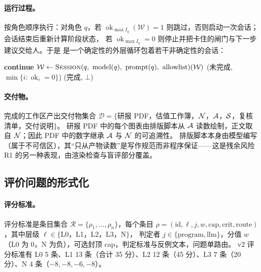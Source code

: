 \paragraph{运行过程。}
 按角色顺序执行：对角色 $q$，若 $\operatorname{ok}_{\max I_q}(\mathcal{W})=1$ 则跳过，否则启动一次会话；会话结束后重新计算阶段状态，
若 $\operatorname{ok}_{\max I_q}=0$ 则停止并把卡住的闸门与下一步建议交给人。于是  是一个确定性的外层循环包着若干非确定性的会话：
\begin{algorithm}[h]
\caption{研报生成的外层编排（ 的抽象）}
\label{alg:prob-run}
\begin{algorithmic}[1]
     \State \textbf{continue} 
    \EndIf
    \State $\mathcal{W}\gets \textsc{Session}(q,\ \text{model}(q),\ \text{prompt}(q),\ \text{allowlist})(\mathcal{W})$ 
     \State \Return (未完成, $\min\{i:\operatorname{ok}_i=0\}$)
    \EndIf
  \EndFor
  \State \Return (完成, $\bot$)
\EndFunction
\end{algorithmic}
\end{algorithm}

\paragraph{交付物。}
完成的工作区产出交付物集合
$\mathcal{D}=\{$研报 PDF，估值工作簿，$\mathcal{N}$，$\mathcal{A}$，$\mathcal{S}$，复核清单，交付说明$\}$。
研报 PDF 中的每个图表由排版脚本从 $\mathcal{A}$ 读数绘制，正文取自 $\mathcal{N}$；因此 PDF 中的数字继承 $\mathcal{A}$ 与 $\mathcal{N}$ 的可追溯性。
排版脚本本身由模型编写（属于不可信区），其“只从产物读数”是写作规范而非程序保证——这是残余风险 R1 的另一种表现，由渲染检查与盲评部分覆盖。

\subsection{评价问题的形式化}
\label{sec:prob-evalform}

\paragraph{评分标准。}
评分标准是条目集合 $\mathcal{R}=\{\rho_1,\dots,\rho_n\}$，每个条目
$\rho=(\text{id},\ell,j,w,\text{cap},\text{crit},\text{route})$，其中层级 $\ell\in\{$L0，L1，L2，L3，N$\}$，
判定者 $j\in\{\text{program},\text{llm}\}$，分值 $w$（L0 为 0，N 为负），可选封顶 cap，判定标准与反例文本，问题单路由。
v2 评分标准有 L0 5 条、L1 13 条（合计 35 分）、L2 12 条（45 分）、L3 7 条（20 分）、N 4 条（$-8,-8,-6,-8$）。

